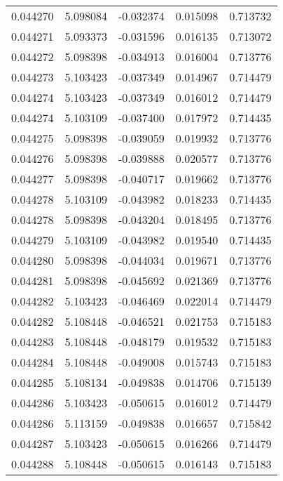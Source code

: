 \begin{tabular}{lrrrr}
0.044270    &  5.098084 & -0.032374 &  0.015098 &             0.713732 \\
0.044271    &  5.093373 & -0.031596 &  0.016135 &             0.713072 \\
0.044272    &  5.098398 & -0.034913 &  0.016004 &             0.713776 \\
0.044273    &  5.103423 & -0.037349 &  0.014967 &             0.714479 \\
0.044274    &  5.103423 & -0.037349 &  0.016012 &             0.714479 \\
0.044274    &  5.103109 & -0.037400 &  0.017972 &             0.714435 \\
0.044275    &  5.098398 & -0.039059 &  0.019932 &             0.713776 \\
0.044276    &  5.098398 & -0.039888 &  0.020577 &             0.713776 \\
0.044277    &  5.098398 & -0.040717 &  0.019662 &             0.713776 \\
0.044278    &  5.103109 & -0.043982 &  0.018233 &             0.714435 \\
0.044278    &  5.098398 & -0.043204 &  0.018495 &             0.713776 \\
0.044279    &  5.103109 & -0.043982 &  0.019540 &             0.714435 \\
0.044280    &  5.098398 & -0.044034 &  0.019671 &             0.713776 \\
0.044281    &  5.098398 & -0.045692 &  0.021369 &             0.713776 \\
0.044282    &  5.103423 & -0.046469 &  0.022014 &             0.714479 \\
0.044282    &  5.108448 & -0.046521 &  0.021753 &             0.715183 \\
0.044283    &  5.108448 & -0.048179 &  0.019532 &             0.715183 \\
0.044284    &  5.108448 & -0.049008 &  0.015743 &             0.715183 \\
0.044285    &  5.108134 & -0.049838 &  0.014706 &             0.715139 \\
0.044286    &  5.103423 & -0.050615 &  0.016012 &             0.714479 \\
0.044286    &  5.113159 & -0.049838 &  0.016657 &             0.715842 \\
0.044287    &  5.103423 & -0.050615 &  0.016266 &             0.714479 \\
0.044288    &  5.108448 & -0.050615 &  0.016143 &             0.715183 \\

\end{tabular}
